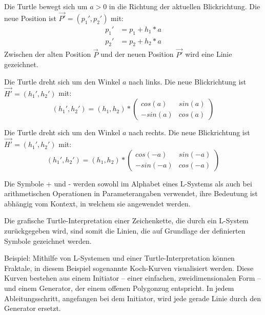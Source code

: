 \begin{description}[labelindent]
	\item[$F(a)$] Die Turtle bewegt sich um $a>0$ in die Richtung der aktuellen Blickrichtung. Die neue Position ist  $\overrightarrow{P'} = (p_1',p_2')$ mit:
	\begin{equation}
	\begin{array}{ll}
	p_1' & = p_1 + h_1 * a\\
	p_2' & = p_2 + h_2 * a
	\end{array}
	\end{equation} 
	Zwischen der alten Position $\overrightarrow{P}$ und der neuen Position $\overrightarrow{P'}$ wird eine Linie gezeichnet.
	
	\item[$+(a)$]  Die Turtle dreht sich um den Winkel $a$ nach links. Die neue Blickrichtung ist $\overrightarrow{H'} = (h_1', h_2')$ mit:
	\begin{equation}
	(h_1', h_2') = (h_1, h_2) *
	\begin{pmatrix}
	cos(a) & sin(a)\\
	-sin(a) & cos(a)
	\end{pmatrix}
	\end{equation} 
	
	\item[$-(a)$]  Die Turtle dreht sich um den Winkel $a$ nach rechts. Die neue Blickrichtung ist $\overrightarrow{H'} = (h_1', h_2')$ mit:
	\begin{equation}
	(h_1', h_2') = (h_1, h_2) *
	\begin{pmatrix}
	cos(-a) & sin(-a)\\
	-sin(-a) & cos(-a)
	\end{pmatrix}
	\end{equation} 
	
\end{description}
\cite[S.4,46]{Turtle:04} \cite[S.7]{ABOP:04}
Die Symbole \glqq+\grqq{} und \glqq-\grqq{} werden sowohl im Alphabet eines L-Systems als auch bei arithmetischen Operationen in Parameterangaben verwendet, ihre Bedeutung ist abhängig vom Kontext, in welchem sie angewendet werden. \cite[S.46]{ABOP:04}

Die grafische Turtle-Interpretation einer Zeichenkette, die durch ein L-System zurückgegeben wird, sind somit die Linien, die auf Grundlage der definierten Symbole gezeichnet werden. 

Beispiel: Mithilfe von L-Systemen und einer Turtle-Interpretation können Fraktale, in diesem Beispiel sogenannte Koch-Kurven visualisiert werden. Diese Kurven bestehen aus einem Initiator -- einer einfachen, zweidimensionalen Form -- und einem Generator, der einem offenen Polygonzug entspricht. In jedem Ableitungsschritt, angefangen bei dem Initiator, wird jede gerade Linie durch den Generator ersetzt. \cite[S.39]{Mandelbrot:16} 

